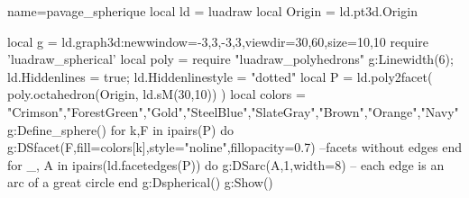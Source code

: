 \begin{luadraw}{name=pavage_spherique}
local ld = luadraw
local Origin = ld.pt3d.Origin

local g = ld.graph3d:new{window={-3,3,-3,3},viewdir={30,60},size={10,10}}
require 'luadraw_spherical'
local poly = require "luadraw_polyhedrons"
g:Linewidth(6); ld.Hiddenlines = true; ld.Hiddenlinestyle = "dotted"
local P = ld.poly2facet( poly.octahedron(Origin, ld.sM(30,10)) )
local colors = {"Crimson","ForestGreen","Gold","SteelBlue","SlateGray","Brown","Orange","Navy"}
g:Define_sphere()
for k,F in ipairs(P) do
    g:DSfacet(F,{fill=colors[k],style="noline",fillopacity=0.7})  --facets without edges
end
for _, A in ipairs(ld.facetedges(P)) do
    g:DSarc(A,1,{width=8}) -- each edge is an arc of a great circle
end
g:Dspherical()
g:Show()
\end{luadraw}
